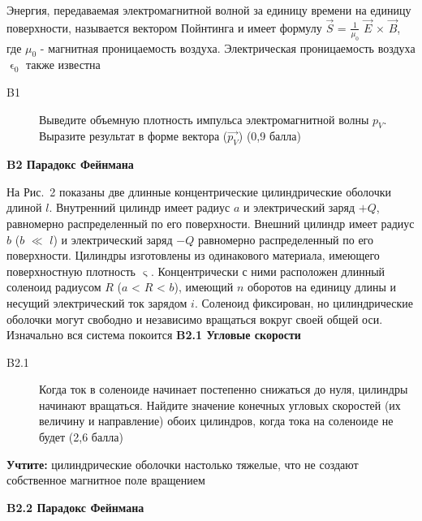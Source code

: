 \documentclass[a4paper, 14pt]{article}
\begin{document}
    \vspace{\baselineskip}
    Энергия, передаваемая электромагнитной волной за единицу времени на единицу поверхности, называется вектором
    Пойнтинга и имеет формулу $\vec{S}$ = $\frac{1}{\mu_0}$ $\vec{E}$ $\times$ $\vec{B}$, где $\mu_0$ - магнитная
    проницаемость воздуха.
    Электрическая проницаемость воздуха ${\upvarepsilon_0}$ также известна
    
    \begin{description}
        \item [B1] Выведите объемную плотность импульса электромагнитной
        волны $p_V$.
        Выразите результат в форме вектора ($\overrightarrow{p_V}$) (0,9 балла)
    \end{description}
    
    \vspace{\baselineskip}
    \textbf{B2 Парадокс Фейнмана}
    
    \vspace{\baselineskip}
    На Рис.~2 показаны две длинные концентрические цилиндрические оболочки длиной $l$.
    Внутренний цилиндр имеет
    радиус $a$ и электрический заряд $+Q$, равномерно распределенный по его поверхности.
    Внешний цилиндр имеет радиус $b$ ($b$ $\ll$ $l$)
    и электрический заряд $-Q$ равномерно распределенный по его поверхности.
    Цилиндры изготовлены из одинакового материала, имеющего поверхностную плотность $\upvarsigma$.
    Концентрически с ними расположен длинный соленоид радиусом $R$ ($a$ < $R$ < $b$), имеющий $n$ оборотов на единицу
    длины и несущий электрический ток зарядом $i$.
    Соленоид фиксирован, но цилиндрические оболочки могут свободно и независимо вращаться вокруг своей общей оси.
    Изначально вся система покоится
    \newpage
    \vspace{\baselineskip}
    \textbf{B2.1 Угловые скорости}
    
    \begin{description}
        \item [B2.1] Когда ток в соленоиде начинает постепенно снижаться до нуля, цилиндры начинают вращаться.
        Найдите значение конечных угловых скоростей (их величину и направление) обоих цилиндров, когда тока на
        соленоиде не будет (2,6 балла)
    \end{description}
    
    \textbf{Учтите:} цилиндрические оболочки настолько тяжелые, что не создают собственное магнитное поле вращением
    
    \vspace{\baselineskip}
    \textbf{B2.2 Парадокс Фейнмана}
    
\end{document}
